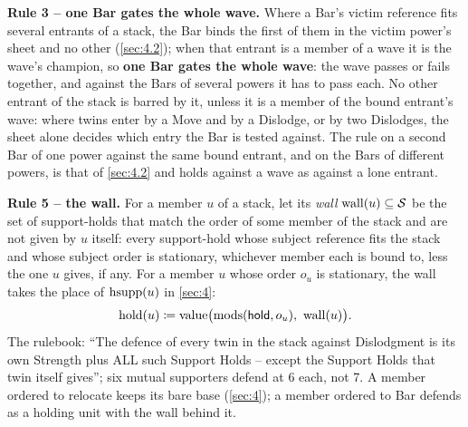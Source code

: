 \documentclass[12pt,a4paper]{article}
\begin{document}
\textbf{Rule 3 -- one Bar gates the whole wave.}
Where a Bar's victim reference fits several entrants of a stack, the Bar binds the first of them in the victim power's sheet and no other (\cref{sec:4.2}); when that entrant is a member of a wave it is the wave's champion, so \textbf{one Bar gates the whole wave}: the wave passes or fails together, and against the Bars of several powers it has to pass each.
No other entrant of the stack is barred by it, unless it is a member of the bound entrant's wave: where twins enter by a Move and by a Dislodge, or by two Dislodges, the sheet alone decides which entry the Bar is tested against.
The rule on a second Bar of one power against the same bound entrant, and on the Bars of different powers, is that of \cref{sec:4.2} and holds against a wave as against a lone entrant.

\textbf{Rule 5 -- the wall.}
For a member $u$ of a stack, let its \emph{wall} $\operatorname{wall}(u) \subseteq \mathcal{S}$ be the set of support-holds that match the order of some member of the stack and are not given by $u$ itself: every support-hold whose subject reference fits the stack and whose subject order is stationary, whichever member each is bound to, less the one $u$ gives, if any.
For a member $u$ whose order $o_u$ is stationary, the wall takes the place of $\operatorname{hsupp}(u)$ in \cref{sec:4}:
\[
\operatorname{hold}(u) \coloneqq \operatorname{value}\bigl(\operatorname{mods}(\mathsf{hold}, o_u),\ \operatorname{wall}(u)\bigr).
\]
The rulebook: ``The defence of every twin in the stack against Dislodgment is its own Strength plus ALL such Support Holds -- except the Support Holds that twin itself gives''; six mutual supporters defend at 6 each, not 7.
A member ordered to relocate keeps its bare base (\cref{sec:4}); a member ordered to Bar defends as a holding unit with the wall behind it.
\end{document}
